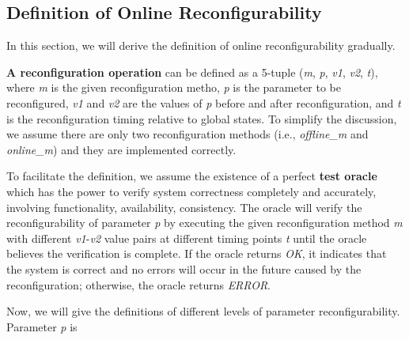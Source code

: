 


\subsection{Definition of Online Reconfigurability}
In this section, we will derive the definition of online reconfigurability gradually. 

\textbf{A reconfiguration operation} can be defined as a 5-tuple (\textit{m}, \textit{p}, \textit{v1}, \textit{v2}, \textit{t}), where \textit{m} is the given reconfiguration metho, \textit{p} is the parameter to be reconfigured, \textit{v1} and \textit{v2} are the values of \textit{p} before and after reconfiguration, and \textit{t} is the reconfiguration timing relative to global states. To simplify the discussion, we assume there are only two reconfiguration methods (i.e., \textit{offline\_m} and \textit{online\_m}) and they are implemented correctly.

To facilitate the definition, we assume the existence of a perfect \textbf{test oracle} which has the power to verify system correctness completely and accurately, involving functionality, availability, consistency. The oracle will verify the reconfigurability of parameter \textit{p} by executing the given reconfiguration method \textit{m} with different \textit{v1}-\textit{v2} value pairs at different timing points \textit{t} until the oracle believes the verification is complete. If the oracle returns \textit{OK}, it indicates that the system is correct and no errors will occur in the future caused by the reconfiguration; otherwise, the oracle returns \textit{ERROR}.

Now, we will give the definitions of different levels of parameter reconfigurability. Parameter \textit{p} is 

